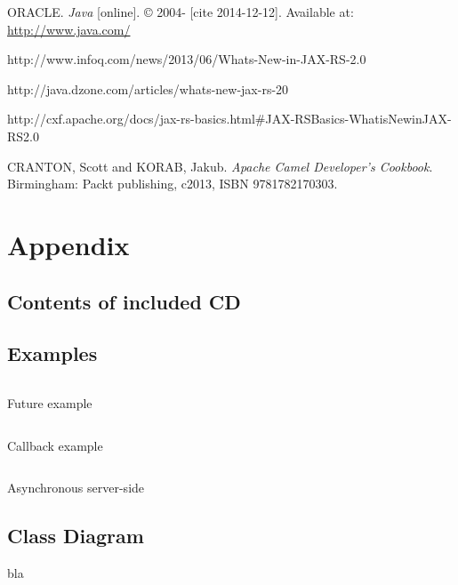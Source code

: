 \documentclass[12pt,final,oneside]{fithesis2}
\begin{document}
\begin{thebibliography}{}
 ORACLE. \textit{Java} [online]. \copyright{} 2004- [cite 2014-12-12]. Available at: \url{http://www.java.com/}		

 http://www.infoq.com/news/2013/06/Whats-New-in-JAX-RS-2.0

 http://java.dzone.com/articles/whats-new-jax-rs-20 	

 http://cxf.apache.org/docs/jax-rs-basics.html\#JAX-RSBasics-WhatisNewinJAX-RS2.0

%
 CRANTON, Scott and KORAB, Jakub. \textit{Apache Camel Developer's Cookbook}.  Birmingham: Packt publishing, c2013, ISBN 9781782170303.
%
%




\end{thebibliography}

\endgroup
\appendix

\chapter{Appendix}

\section{Contents of included CD}
\newpage
\section{Examples}
\begin{listing}[ht]
	\inputminted[]{java}{sources/future.java}
	\caption{Future example}
	\label{future}
\end{listing}
\begin{listing}[ht]
	\inputminted[]{java}{sources/callbackClient.java}
	\caption{Callback example}
	\label{callbackClient}
\end{listing}

\begin{listing}[ht]
	\inputminted[]{java}{sources/todo.java}
	\caption{Asynchronous server-side}
	\label{async-server}
\end{listing}
\newpage
\section{Class Diagram}
bla
\end{document}
